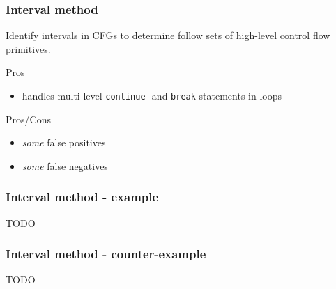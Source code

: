 \documentclass[aspectratio=1610]{beamer}
\begin{document}
\begin{frame}
	\frametitle{Interval method}

	Identify intervals in CFGs to determine follow sets of high-level control flow primitives.

	\vspace*{2em}

	\begin{block}{Pros}
		\begin{itemize}
			\item handles multi-level \texttt{continue}- and \texttt{break}-statements in loops
		\end{itemize}
	\end{block}

	\begin{block}{Pros/Cons}
		\begin{itemize}
			\item \textit{some} false positives
			\item \textit{some} false negatives
		\end{itemize}
	\end{block}


\end{frame}

\begin{frame}
	\frametitle{Interval method - example}

	TODO
\end{frame}

\begin{frame}
	\frametitle{Interval method - counter-example}

	TODO

\end{frame}

\end{document}
